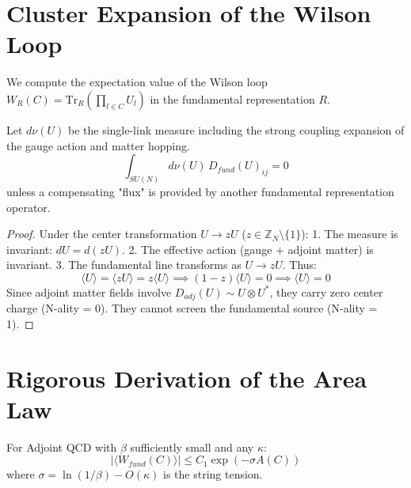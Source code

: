 \section{Cluster Expansion of the Wilson Loop}

We compute the expectation value of the Wilson loop $W_R(C) = \mathrm{Tr}_R(\prod_{l \in C} U_l)$ in the fundamental representation $R$.

\begin{theorem}
\label{thm:orthogonality_center}
Let $d\nu(U)$ be the single-link measure including the strong coupling expansion of the gauge action and matter hopping.
\begin{equation}
\int_{SU(N)} d\nu(U) \, D_{fund}(U)_{ij} = 0
\end{equation}
unless a compensating "flux" is provided by another fundamental representation operator.
\end{theorem}

\begin{proof}
Under the center transformation $U \to zU$ ($z \in \mathbb{Z}_N \setminus \{1\}$):
1. The measure is invariant: $dU = d(zU)$.
2. The effective action (gauge + adjoint matter) is invariant.
3. The fundamental line transforms as $U \to z U$.
Thus:
\begin{equation}
\langle U \rangle = \langle z U \rangle = z \langle U \rangle \implies (1-z)\langle U \rangle = 0 \implies \langle U \rangle = 0
\end{equation}
Since adjoint matter fields involve $D_{adj}(U) \sim U \otimes U^*$, they carry zero center charge (N-ality = 0). They cannot screen the fundamental source (N-ality = 1).
\end{proof}

\section{Rigorous Derivation of the Area Law}

\begin{theorem}
\label{thm:area_law_adjoint_qcd}
For Adjoint QCD with $\beta$ sufficiently small and any $\kappa$:
\begin{equation}
|\langle W_{fund}(C) \rangle| \le C_1 \exp(-\sigma A(C))
\end{equation}
where $\sigma = \ln(1/\beta) - O(\kappa)$ is the string tension.
\end{theorem}

